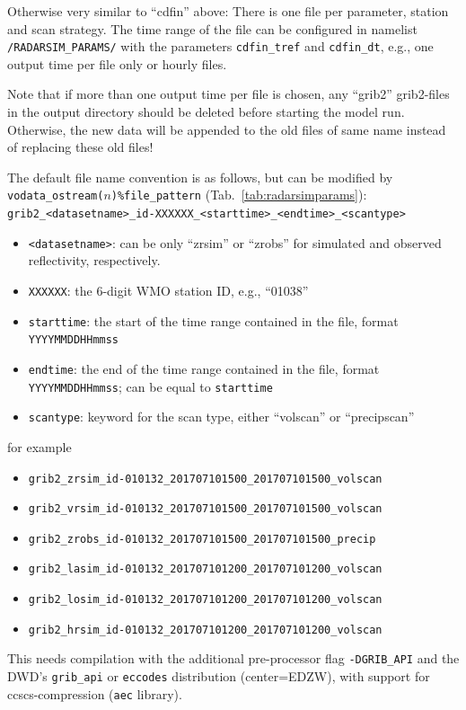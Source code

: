\documentclass[10pt,a4paper,twoside,headinclude,footinclude,parskip=half]{scrartcl}
\newcommand{\srcform}[1]{\mbox{\texttt{#1}}\xspace}%
\newcommand{\paramform}[1]{\mbox{\texttt{#1}}\xspace}%
\begin{document}
\begin{itemize}
    Otherwise very similar to ``cdfin'' above:
    There is one file per parameter, station and scan strategy. The time range of
    the file can be configured in namelist \srcform{/RADARSIM\_PARAMS/} with the parameters \srcform{cdfin\_tref} and \srcform{cdfin\_dt},
    e.g., one output time per file only or hourly files.

    Note that if more than one output time per file is chosen, any ``grib2'' grib2-files in the output directory should
    be deleted before starting the model run. Otherwise, the new data will be appended to the old files of
    same name instead of replacing these old files!

    The default file name convention is as follows, but can be modified by \paramform{vodata_ostream($n$)\%file_pattern} (Tab.~\ref{tab:radarsimparams}):\\[0.5em]
    \verb|grib2_<datasetname>_id-XXXXXX_<starttime>_<endtime>_<scantype>|
    \begin{itemize}
    \item \verb|<datasetname>|: can be only ``zrsim'' or ``zrobs'' for simulated and observed reflectivity, respectively.    
    \item \verb|XXXXXX|: the 6-digit WMO station ID, e.g., ``01038''
    \item \verb|starttime|: the start of the time range contained in the file, format \verb|YYYYMMDDHHmmss|
    \item \verb|endtime|:  the end of the time range contained in the file, format \verb|YYYYMMDDHHmmss|; can be equal to \verb|starttime|
    \item \verb|scantype|: keyword for the scan type, either ``volscan'' or ``precipscan''
    \end{itemize}
    for example
    \begin{itemize}
    \item \verb|grib2_zrsim_id-010132_201707101500_201707101500_volscan|
    \item \verb|grib2_vrsim_id-010132_201707101500_201707101500_volscan|
    \item \verb|grib2_zrobs_id-010132_201707101500_201707101500_precip|
    \item \verb|grib2_lasim_id-010132_201707101200_201707101200_volscan|
    \item \verb|grib2_losim_id-010132_201707101200_201707101200_volscan|
    \item \verb|grib2_hrsim_id-010132_201707101200_201707101200_volscan|
    \end{itemize}
    This needs compilation with the additional pre-processor flag \srcform{-DGRIB_API} and the DWD's \srcform{grib_api} or \srcform{eccodes} distribution (center=EDZW), with support for ccscs-compression (\srcform{aec} library).


\end{itemize}
\end{document}
